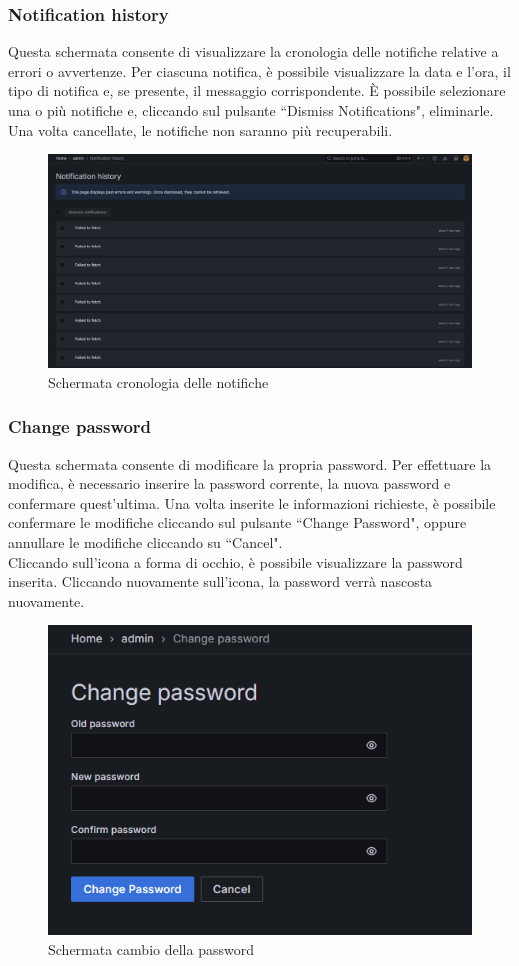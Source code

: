 \documentclass[10pt]{article}
\begin{document}
\begin{justify}
    \subsubsection{Notification history}
    Questa schermata consente di visualizzare la cronologia delle notifiche relative a errori o avvertenze. Per ciascuna notifica, è possibile visualizzare la data e l'ora, il tipo di notifica e, se presente, il messaggio corrispondente. È possibile selezionare una o più notifiche e, cliccando sul pulsante ``Dismiss Notifications", eliminarle. Una volta cancellate, le notifiche non saranno più recuperabili.
    \begin{figure}[H]
    \centering
    \includegraphics[width=1\linewidth]{notification.png}
    \caption{Schermata cronologia delle notifiche}
    \end{figure}

    \subsubsection{Change password}
    Questa schermata consente di modificare la propria password. Per effettuare la modifica, è necessario inserire la password corrente, la nuova password e confermare quest'ultima. Una volta inserite le informazioni richieste, è possibile confermare le modifiche cliccando sul pulsante ``Change Password", oppure annullare le modifiche cliccando su ``Cancel".\\
    Cliccando sull'icona a forma di occhio, è possibile visualizzare la password inserita. Cliccando nuovamente sull'icona, la password verrà nascosta nuovamente.
    \begin{figure}[H]
    \centering
    \includegraphics[width=0.5\linewidth]{password.png}
    \caption{Schermata cambio della password}
    \end{figure}


\end{justify}
\end{document}
